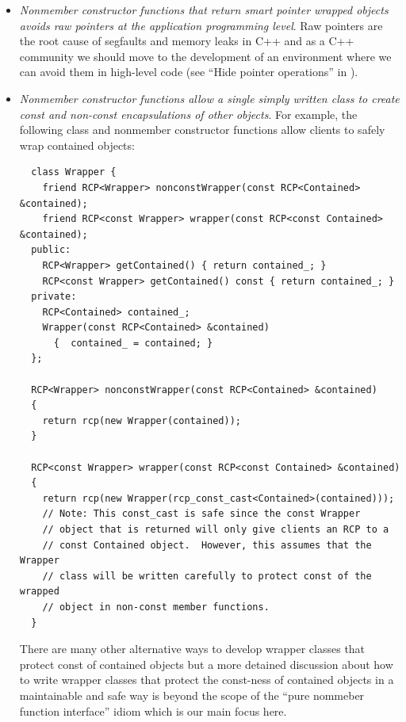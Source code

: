 \documentclass[pdf,ps2pdf,11pt]{SANDreport}
\begin{document}
\begin{itemize}

{}\item\textit{Nonmember constructor functions that return smart pointer
wrapped objects avoids raw pointers at the application programming level}.
Raw pointers are the root cause of segfaults and memory leaks in C++ and as a
C++ community we should move to the development of an environment where we can
avoid them in high-level code (see ``Hide pointer operations'' in
{}\cite[Section 7.1]{CodeComplete2nd04}).

{}\item\textit{Nonmember constructor functions allow a single simply written
class to create const and non-const encapsulations of other objects}.  For
example, the following class and nonmember constructor functions allow clients
to safely wrap contained objects:

{\small\begin{verbatim}
  class Wrapper {
    friend RCP<Wrapper> nonconstWrapper(const RCP<Contained> &contained);
    friend RCP<const Wrapper> wrapper(const RCP<const Contained> &contained);
  public:
    RCP<Wrapper> getContained() { return contained_; }
    RCP<const Wrapper> getContained() const { return contained_; }
  private:
    RCP<Contained> contained_;
    Wrapper(const RCP<Contained> &contained)
      {  contained_ = contained; }
  };

  RCP<Wrapper> nonconstWrapper(const RCP<Contained> &contained)
  {
    return rcp(new Wrapper(contained));
  }

  RCP<const Wrapper> wrapper(const RCP<const Contained> &contained)
  {
    return rcp(new Wrapper(rcp_const_cast<Contained>(contained)));
    // Note: This const_cast is safe since the const Wrapper
    // object that is returned will only give clients an RCP to a
    // const Contained object.  However, this assumes that the Wrapper
    // class will be written carefully to protect const of the wrapped
    // object in non-const member functions.
  }

\end{verbatim}}

There are many other alternative ways to develop wrapper classes that protect
const of contained objects but a more detained discussion about how to write
wrapper classes that protect the const-ness of contained objects in a
maintainable and safe way is beyond the scope of the ``pure nommeber function
interface'' idiom which is our main focus here.

\end{itemize}
\end{document}
